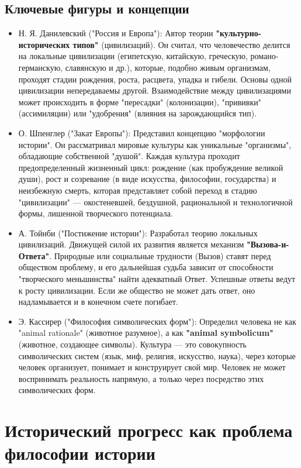\documentclass[12pt,a4paper]{article}
\begin{document}
	\subsection{Ключевые фигуры и концепции}
	\begin{itemize}
		\item Н. Я. Данилевский ("Россия и Европа"): Автор теории \textbf{"культурно-исторических типов"} (цивилизаций). Он считал, что человечество делится на локальные цивилизации (египетскую, китайскую, греческую, романо-германскую, славянскую и др.), которые, подобно живым организмам, проходят стадии рождения, роста, расцвета, упадка и гибели. Основы одной цивилизации непередаваемы другой. Взаимодействие между цивилизациями может происходить в форме "пересадки" (колонизации), "прививки" (ассимиляции) или "удобрения" (влияния на зарождающийся тип).
		\item О. Шпенглер ("Закат Европы"): Представил концепцию "морфологии истории". Он рассматривал мировые культуры как уникальные "организмы", обладающие собственной "душой". Каждая культура проходит предопределенный жизненный цикл: рождение (как пробуждение великой души), рост и созревание (в виде искусства, философии, государства) и неизбежную смерть, которая представляет собой переход в стадию "цивилизации" --- окостеневшей, бездушной, рациональной и технологичной формы, лишенной творческого потенциала.
		\item А. Тойнби ("Постижение истории"): Разработал теорию локальных цивилизаций. Движущей силой их развития является механизм \textbf{"Вызова-и-Ответа"}. Природные или социальные трудности (Вызов) ставят перед обществом проблему, и его дальнейшая судьба зависит от способности "творческого меньшинства" найти адекватный Ответ. Успешные ответы ведут к росту цивилизации. Если же общество не может дать ответ, оно надламывается и в конечном счете погибает.
		\item Э. Кассирер ("Философия символических форм"): Определил человека не как "animal rationale" (животное разумное), а как \textbf{"animal symbolicum"} (животное, создающее символы). Культура --- это совокупность символических систем (язык, миф, религия, искусство, наука), через которые человек организует, понимает и конструирует свой мир. Человек не может воспринимать реальность напрямую, а только через посредство этих символических форм.
	\end{itemize}
	
	\section{Исторический прогресс как проблема философии истории~\checkmark}
\end{document}
